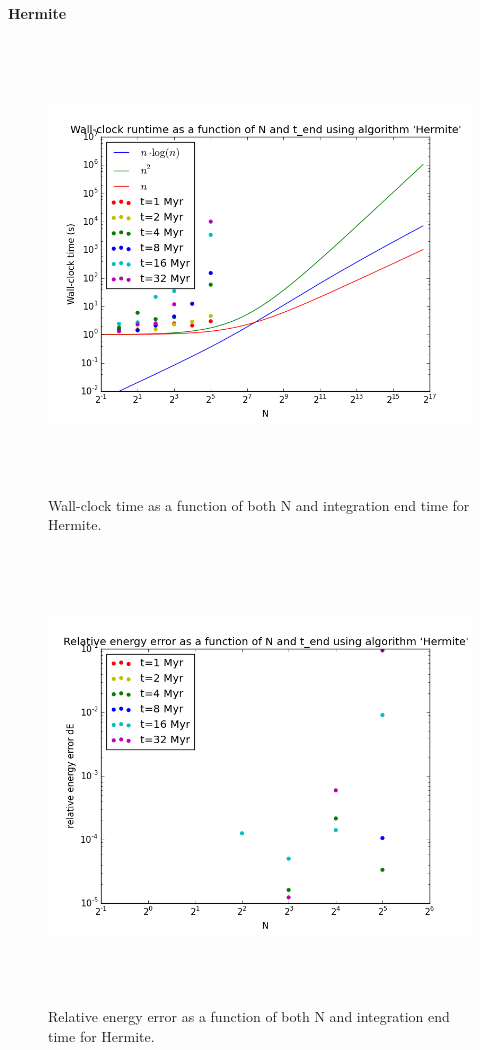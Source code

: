 \documentclass[a4paper]{article}
\begin{document}
\noindent \textbf{Hermite} \\

\begin{figure}[h!]
\begin{center}
\includegraphics[height=12cm]{../GravitationalDynamics/plots/CA_GD_TLRH_s1603221_SS_s1617451_Hermite_runtime.png}
\caption{Wall-clock time as a function of both N and integration end time for Hermite.}
\label{fig:Hermite_runtime}
\end{center}
\end{figure}

\begin{figure}[h!]
\begin{center}
\includegraphics[height=12cm]{../GravitationalDynamics/plots/CA_GD_TLRH_s1603221_SS_s1617451_Hermite_dE.png}
\caption{Relative energy error as a function of both N and integration end time for Hermite.}
\label{fig:Hermite_dE}
\end{center}
\end{figure}
\end{document}
